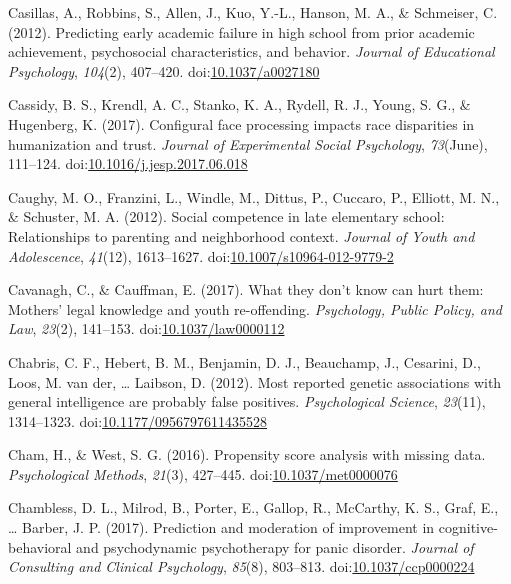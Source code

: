 \documentclass[english,man]{apa6}
\theoremstyle{definition}
\theoremstyle{definition}
\theoremstyle{definition}
\theoremstyle{remark}
\begin{document}
\hypertarget{ref-Casillas2012}{}
Casillas, A., Robbins, S., Allen, J., Kuo, Y.-L., Hanson, M. A., \&
Schmeiser, C. (2012). Predicting early academic failure in high school
from prior academic achievement, psychosocial characteristics, and
behavior. \emph{Journal of Educational Psychology}, \emph{104}(2),
407--420. doi:\href{https://doi.org/10.1037/a0027180}{10.1037/a0027180}

\hypertarget{ref-Cassidy2017}{}
Cassidy, B. S., Krendl, A. C., Stanko, K. A., Rydell, R. J., Young, S.
G., \& Hugenberg, K. (2017). Configural face processing impacts race
disparities in humanization and trust. \emph{Journal of Experimental
Social Psychology}, \emph{73}(June), 111--124.
doi:\href{https://doi.org/10.1016/j.jesp.2017.06.018}{10.1016/j.jesp.2017.06.018}

\hypertarget{ref-Caughy2012}{}
Caughy, M. O., Franzini, L., Windle, M., Dittus, P., Cuccaro, P.,
Elliott, M. N., \& Schuster, M. A. (2012). Social competence in late
elementary school: Relationships to parenting and neighborhood context.
\emph{Journal of Youth and Adolescence}, \emph{41}(12), 1613--1627.
doi:\href{https://doi.org/10.1007/s10964-012-9779-2}{10.1007/s10964-012-9779-2}

\hypertarget{ref-Cavanagh2017}{}
Cavanagh, C., \& Cauffman, E. (2017). What they don't know can hurt
them: Mothers' legal knowledge and youth re-offending. \emph{Psychology,
Public Policy, and Law}, \emph{23}(2), 141--153.
doi:\href{https://doi.org/10.1037/law0000112}{10.1037/law0000112}

\hypertarget{ref-Chabris2012}{}
Chabris, C. F., Hebert, B. M., Benjamin, D. J., Beauchamp, J., Cesarini,
D., Loos, M. van der, \ldots{} Laibson, D. (2012). Most reported genetic
associations with general intelligence are probably false positives.
\emph{Psychological Science}, \emph{23}(11), 1314--1323.
doi:\href{https://doi.org/10.1177/0956797611435528}{10.1177/0956797611435528}

\hypertarget{ref-Cham2016}{}
Cham, H., \& West, S. G. (2016). Propensity score analysis with missing
data. \emph{Psychological Methods}, \emph{21}(3), 427--445.
doi:\href{https://doi.org/10.1037/met0000076}{10.1037/met0000076}

\hypertarget{ref-Chambless2017a}{}
Chambless, D. L., Milrod, B., Porter, E., Gallop, R., McCarthy, K. S.,
Graf, E., \ldots{} Barber, J. P. (2017). Prediction and moderation of
improvement in cognitive-behavioral and psychodynamic psychotherapy for
panic disorder. \emph{Journal of Consulting and Clinical Psychology},
\emph{85}(8), 803--813.
doi:\href{https://doi.org/10.1037/ccp0000224}{10.1037/ccp0000224}
\end{document}
